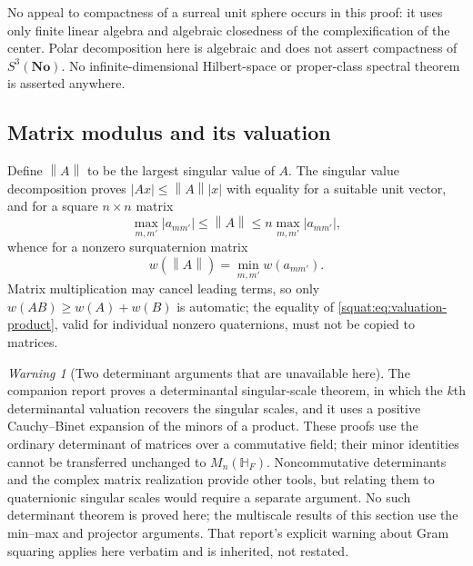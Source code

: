 \documentclass[11pt,letterpaper]{article}
\numberwithin{equation}{section}
\theoremstyle{definition}
\theoremstyle{remark}
\newtheorem{warning}[warning]{Warning}
\newcommand{\No}{\mathbf{No}}
\newcommand{\HF}{\mathbb H_F}
\newcommand{\abs}[1]{\left|#1\right|}
\newcommand{\norm}[1]{\left\|#1\right\|}
\begin{document}
No appeal to compactness of a surreal unit sphere occurs in this proof: it uses only
finite linear algebra and algebraic closedness of the complexification of the center.
Polar decomposition here is algebraic and does not assert compactness of $S^3(\No)$. No
infinite-dimensional Hilbert-space or proper-class spectral theorem is asserted anywhere.

\subsection{Matrix modulus and its valuation}\label{squat:sub:matrixnorm}
Define $\norm A$ to be the largest singular value of $A$. The singular value decomposition
proves $\abs{Ax}\le\norm A\abs x$ with equality for a suitable unit vector, and for a
square $n\times n$ matrix
\begin{equation}\label{squat:eq:matrixnorm}
 \max_{m,m'}\abs{a_{mm'}}\le\norm A\le n\max_{m,m'}\abs{a_{mm'}},
\end{equation}
whence for a nonzero surquaternion matrix
\begin{equation}\label{squat:eq:matrixvaluation}
 w(\norm A)=\min_{m,m'}w(a_{mm'}).
\end{equation}
Matrix multiplication may cancel leading terms, so only $w(AB)\ge w(A)+w(B)$ is automatic;
the equality of \cref{squat:eq:valuation-product}, valid for individual nonzero
quaternions, must not be copied to matrices.

\begin{warning}[Two determinant arguments that are unavailable here]\label{squat:warn:nodet}
The companion report \cite{RepoSpec} proves a determinantal singular-scale theorem, in
which the $k$th determinantal valuation recovers the singular scales, and it uses a
positive Cauchy--Binet expansion of the minors of a product. These proofs use the
ordinary determinant of matrices over a commutative field; their minor identities cannot
be transferred unchanged to $M_n(\HF)$. Noncommutative determinants and the complex
matrix realization provide other tools, but relating them to quaternionic singular
scales would require a separate argument. No such determinant theorem is proved here;
the multiscale results of this section use the min--max and projector arguments.
That report's explicit warning about Gram squaring applies here
verbatim and is inherited, not restated.
\end{warning}
\end{document}
